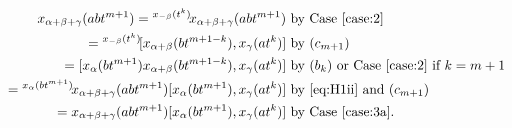 \documentclass[oneside, 10pt]{amsart}
\theoremstyle{remark}
\begin{document}
\begin{enumerate}
\begin{enumerate}
\begin{align*}
 x_{\alpha+\beta+\gamma}(abt^{m+1}) = {}^{x_{-\beta}(t^k)}\!x_{\alpha+\beta+\gamma}(abt^{m+1}) & \text{ by Case~\eqref{case:2}}\\
 = {}^{x_{-\beta}(t^k)}\![x_{\alpha+\beta}(bt^{m+1-k}), x_\gamma(at^k)] & \text{ by $(c_{m+1})$} \\
 = [x_{\alpha}(bt^{m+1}) x_{\alpha+\beta}(bt^{m+1-k}), x_\gamma(at^k)] & \text{ by $(b_k)$ or Case~\eqref{case:2} if $k=m+1$ }\\
 = {}^{x_{\alpha}(bt^{m+1})}\!x_{\alpha+\beta+\gamma}(abt^{m+1}) [x_{\alpha}(bt^{m+1}), x_\gamma(at^k)] & \text{ by~\eqref{eq:H1ii} and $(c_{m+1})$} \\
 = x_{\alpha+\beta+\gamma}(abt^{m+1}) [x_{\alpha}(bt^{m+1}), x_\gamma(at^k)] & \text{ by Case~\eqref{case:3a}.}
\end{align*}
\end{enumerate}
\end{enumerate}


\printbibliography
\end{document}
